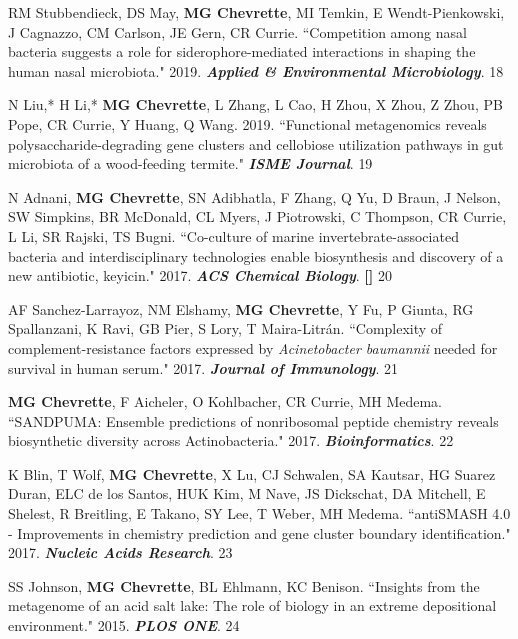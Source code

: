 \begin{cvpubs}
\cvpub
{RM Stubbendieck, DS May, \textbf{MG Chevrette}, MI Temkin, E Wendt-Pienkowski, J Cagnazzo, CM Carlson, JE Gern, CR Currie. ``Competition among nasal bacteria suggests a role for siderophore-mediated interactions in shaping the human nasal microbiota." 2019. \textit{\textbf{Applied \& Environmental Microbiology}}. \textbf{\textit{}}}
{18}

\cvpub
{N Liu,* H Li,* \textbf{MG Chevrette}, L Zhang, L Cao, H Zhou, X Zhou, Z Zhou, PB Pope, CR Currie, Y Huang, Q Wang. 2019. ``Functional metagenomics reveals polysaccharide-degrading gene clusters and cellobiose utilization pathways in gut microbiota of a wood-feeding termite." \textit{\textbf{ISME Journal}}. \textbf{\textit{}}}
{19}

\cvpub
{N Adnani, \textbf{MG Chevrette}, SN Adibhatla, F Zhang, Q Yu, D Braun, J Nelson, SW Simpkins, BR McDonald, CL Myers, J Piotrowski, C Thompson, CR Currie, L Li, SR Rajski, TS Bugni. ``Co-culture of marine invertebrate-associated bacteria and interdisciplinary technologies enable biosynthesis and discovery of a new antibiotic, keyicin." 2017. \textit{\textbf{ACS Chemical Biology}}.  \textbf{\textit{}} \textbf{[\textit{}]}}
{20}

\cvpub
{AF Sanchez-Larrayoz, NM Elshamy, \textbf{MG Chevrette}, Y Fu, P Giunta, RG Spallanzani, K Ravi, GB Pier, S Lory, T Maira-Litr\'{a}n. ``Complexity of complement-resistance factors expressed by \textit{Acinetobacter baumannii} needed for survival in human serum." 2017. \textit{\textbf{Journal of Immunology}}. \textbf{\textit{}}}
{21}

\cvpub
{\textbf{MG Chevrette}, F Aicheler, O Kohlbacher, CR Currie, MH Medema. ``SANDPUMA: Ensemble predictions of nonribosomal peptide chemistry reveals biosynthetic diversity across Actinobacteria." 2017. \textit{\textbf{Bioinformatics}}. \textbf{\textit{}}}
{22}

\cvpub
{K Blin, T Wolf, \textbf{MG Chevrette}, X Lu, CJ Schwalen, SA Kautsar, HG Suarez Duran, ELC de los Santos, HUK Kim, M Nave, JS Dickschat, DA Mitchell, E Shelest, R Breitling, E Takano, SY Lee, T Weber, MH Medema. ``antiSMASH 4.0 - Improvements in chemistry prediction and gene cluster boundary identification." 2017. \textit{\textbf{Nucleic Acids Research}}. \textbf{\textit{}}}
{23}

\cvpub
{SS Johnson, \textbf{MG Chevrette}, BL Ehlmann, KC Benison. ``Insights from the metagenome of an acid salt lake: The role of biology in an extreme depositional environment."  2015. \textit{\textbf{PLOS ONE}}. \textbf{\textit{}}}
{24}

\end{cvpubs}

